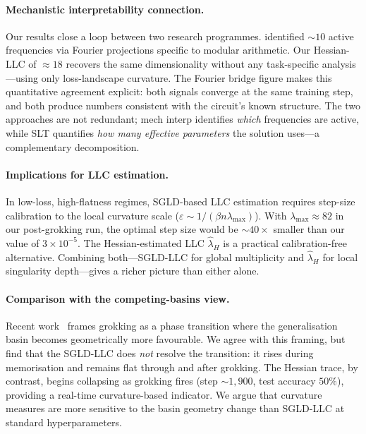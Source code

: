 \documentclass[12pt]{article}
\begin{document}
\paragraph{Mechanistic interpretability connection.}
Our results close a loop between two research programmes.
\citet{nanda2023progress} identified $\sim\!10$ active frequencies via
Fourier projections specific to modular arithmetic.  Our Hessian-LLC of
$\approx\!18$ recovers the same dimensionality without any task-specific
analysis—using only loss-landscape curvature.  The Fourier bridge figure
makes this quantitative agreement explicit: both signals converge at the same
training step, and both produce numbers consistent with the circuit's known
structure.  The two approaches are not redundant; mech interp identifies
\emph{which} frequencies are active, while SLT quantifies \emph{how many
effective parameters} the solution uses—a complementary decomposition.

\paragraph{Implications for LLC estimation.}
In low-loss, high-flatness regimes, SGLD-based LLC estimation requires
step-size calibration to the local curvature scale
($\varepsilon \sim 1/(\beta n \lambda_{\max})$).  With $\lambda_{\max}
\approx 82$ in our post-grokking run, the optimal step size would be
$\sim\!40\times$ smaller than our value of $3\!\times\!10^{-5}$.  The
Hessian-estimated LLC $\hat\lambda_H$ is a practical calibration-free
alternative.  Combining both—SGLD-LLC for global multiplicity and
$\hat\lambda_H$ for local singularity depth—gives a richer picture than
either alone.

\paragraph{Comparison with the competing-basins view.}
Recent work~\citep{competing_basins2026} frames grokking as a phase
transition where the generalisation basin becomes geometrically more
favourable.  We agree with this framing, but find that the SGLD-LLC does
\emph{not} resolve the transition: it rises during memorisation and remains
flat through and after grokking.  The Hessian trace, by contrast, begins
collapsing as grokking fires (step $\sim\!1{,}900$, test accuracy $50\%$),
providing a real-time curvature-based indicator.  We argue that curvature
measures are more sensitive to the basin geometry change than SGLD-LLC at
standard hyperparameters.
\end{document}
